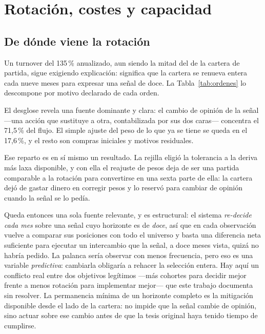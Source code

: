 \section{Rotación, costes y capacidad}
\label{sec:rotacion}

\subsection{De dónde viene la rotación}

Un turnover del 135\,\% anualizado, aun siendo la mitad del de la cartera de partida, sigue
exigiendo explicación: significa que la cartera se renueva entera cada nueve meses para expresar una
señal de doce. La Tabla~\ref{tab:ordenes} lo descompone por motivo declarado de cada orden.

\begin{table}[htbp]
  \centering
  \small
  \caption{Descomposición del flujo de cartera por motivo de orden.}
  \label{tab:ordenes}
  
  \caption*{Cubre la serie completa: 143 órdenes de la ventana de selección y 10 de la era
  reservada. El flujo es la suma de $|\Delta w|$ de cada orden y el coste agrega comisión y
  \textit{slippage} efectivamente cargados.}
\end{table}


El desglose revela una fuente dominante y clara: el cambio de opinión de la señal ---una acción que
sustituye a otra, contabilizada por sus dos caras--- concentra el 71,5\,\% del flujo. El simple
ajuste del peso de lo que ya se tiene se queda en el 17,6\,\%, y el resto son compras iniciales y
motivos residuales.

Ese reparto es en sí mismo un resultado. La rejilla eligió la tolerancia a la deriva más laxa
disponible, y con ella el reajuste de pesos deja de ser una partida comparable a la rotación para
convertirse en una sexta parte de ella: la cartera dejó de gastar dinero en corregir pesos y lo
reservó para cambiar de opinión cuando la señal se lo pedía.

Queda entonces una sola fuente relevante, y es estructural: el sistema \emph{re-decide cada mes}
sobre una señal cuyo horizonte es de \emph{doce}, así que en cada observación vuelve a comparar sus
posiciones con todo el universo y basta una diferencia neta suficiente para ejecutar un intercambio
que la señal, a doce meses vista, quizá no habría pedido. La palanca sería observar con menos
frecuencia, pero eso es una variable \emph{predictiva}: cambiarla obligaría a rehacer la selección
entera. Hay aquí un conflicto real entre dos objetivos legítimos ---más cohortes para decidir mejor
frente a menos rotación para implementar mejor--- que este trabajo documenta sin resolver. La
permanencia mínima de un horizonte completo es la mitigación disponible desde el lado de la cartera:
no impide que la señal cambie de opinión, sino actuar sobre ese cambio antes de que la tesis
original haya tenido tiempo de cumplirse.

